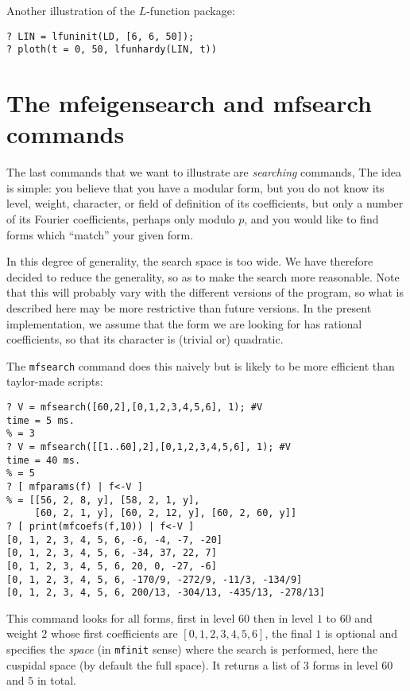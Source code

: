 \documentclass[11pt]{article}
\def\kbd#1{{\tt #1}}
\begin{document}
Another illustration of the $L$-function package:

\begin{verbatim}
? LIN = lfuninit(LD, [6, 6, 50]);
? ploth(t = 0, 50, lfunhardy(LIN, t))
\end{verbatim}


\medskip

\section{The mfeigensearch and mfsearch commands}

The last commands that we want to illustrate are \emph{searching} commands,
The idea is simple: you believe that you have a modular form, but you do not
know its level, weight, character, or field of definition of its
coefficients, but only a number of its Fourier coefficients, perhaps only
modulo $p$, and you would like to find forms which ``match'' your given form.

In this degree of generality, the search space is too wide. We have therefore
decided to reduce the generality, so as to make the search more reasonable.
Note that this will probably vary with the different versions of the program,
so what is described here may be more restrictive than future versions. In
the present implementation, we assume that the form we are looking for has
rational coefficients, so that its character is (trivial or) quadratic.

The \kbd{mfsearch} command does this naively but is likely to be more
efficient than taylor-made scripts:
\begin{verbatim}
? V = mfsearch([60,2],[0,1,2,3,4,5,6], 1); #V
time = 5 ms.
% = 3
? V = mfsearch([[1..60],2],[0,1,2,3,4,5,6], 1); #V
time = 40 ms.
% = 5
? [ mfparams(f) | f<-V ]
% = [[56, 2, 8, y], [58, 2, 1, y],
     [60, 2, 1, y], [60, 2, 12, y], [60, 2, 60, y]]
? [ print(mfcoefs(f,10)) | f<-V ]
[0, 1, 2, 3, 4, 5, 6, -6, -4, -7, -20]
[0, 1, 2, 3, 4, 5, 6, -34, 37, 22, 7]
[0, 1, 2, 3, 4, 5, 6, 20, 0, -27, -6]
[0, 1, 2, 3, 4, 5, 6, -170/9, -272/9, -11/3, -134/9]
[0, 1, 2, 3, 4, 5, 6, 200/13, -304/13, -435/13, -278/13]
\end{verbatim}
This command looks for all forms, first in level $60$ then in level $1$ to $60$
and weight $2$ whose first coefficients are $[0,1,2,3,4,5,6]$, the final $1$
is optional and specifies the \emph{space} (in \kbd{mfinit} sense) where the
search is performed, here the cuspidal space (by default the full space). It
returns a list of $3$ forms in level $60$ and $5$ in total.
\end{document}
